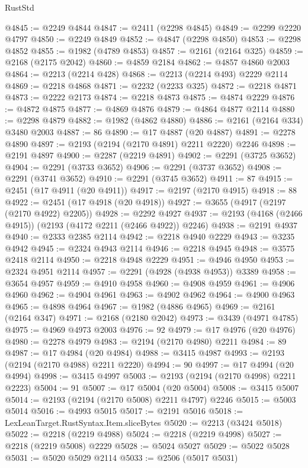 \begin{lexlean}{RustStd}
\begin{coremodule}
@4845 := @2249 @4844
@4847 := @2411 (@2298 @4845)
@4849 := @2299 @2220 @4797
@4850 := @2249 @4849
@4852 := @4847 (@2298 @4850)
@4853 := @2298 @4852
@4855 := @1982 (@4789 @4853)
@4857 := @2161 (@2164 @325)
@4859 := @2168 (@2175 @2042)
@4860 := @4859 @2184
@4862 := @4857 @4860 @2003
@4864 := @2213 (@2214 @428)
@4868 := @2213 (@2214 @493) @2229 @2114
@4869 := @2218 @4868
@4871 := @2232 (@2233 @325)
@4872 := @2218 @4871
@4873 := @2222 @2173
@4874 := @2218 @4873
@4875 := @4874 @2229
@4876 := @4872 @4875
@4877 := @4869 @4876
@4879 := @4864 @4877 @2114
@4880 := @2298 @4879
@4882 := @1982 (@4862 @4880)
@4886 := @2161 (@2164 @334) @3480 @2003
@4887 := 86
@4890 := @17 @4887 (@20 @4887)
@4891 := @2278 @4890
@4897 := @2193 (@2194 (@2170 @4891) @2211 @2220) @2246
@4898 := @2191 @4897
@4900 := @2287 (@2219 @4891)
@4902 := @2291 (@3725 @3652)
@4904 := @2291 (@3733 @3652)
@4906 := @2291 (@3737 @3652)
@4908 := @2291 (@3741 @3652)
@4910 := @2291 (@3745 @3652)
@4911 := 87
@4915 := @2451 (@17 @4911 (@20 @4911))
@4917 := @2197 (@2170 @4915)
@4918 := 88
@4922 := @2451 (@17 @4918 (@20 @4918))
@4927 := @3655 (@4917 (@2197 (@2170 @4922) @2205))
@4928 := @2292 @4927
@4937 := @2193 (@4168 (@2466 @4915)) (@2193 (@4172 @2211 (@2466 @4922)) @2246)
@4938 := @2191 @4937
@4940 := @2333 @2385 @2114
@4942 := @2218 @4940 @2229
@4943 := @3235 @4942
@4945 := @2324 @4943 @2114
@4946 := @2218 @4945
@4948 := @3575 @2418 @2114
@4950 := @2218 @4948 @2229
@4951 := @4946 @4950
@4953 := @2324 @4951 @2114
@4957 := @2291 (@4928 (@4938 @4953)) @3389
@4958 := @3654 @4957
@4959 := @4910 @4958
@4960 := @4908 @4959
@4961 := @4906 @4960
@4962 := @4904 @4961
@4963 := @4902 @4962
@4964 := @4900 @4963
@4965 := @4898 @4964
@4967 := @1982 (@4886 @4965)
@4969 := @2161 (@2164 @347)
@4971 := @2168 (@2180 @2042)
@4973 := @3439 (@4971 @4785)
@4975 := @4969 @4973 @2003
@4976 := 92
@4979 := @17 @4976 (@20 @4976)
@4980 := @2278 @4979
@4983 := @2194 (@2170 @4980) @2211
@4984 := 89
@4987 := @17 @4984 (@20 @4984)
@4988 := @3415 @4987
@4993 := @2193 (@2194 (@2170 @4988) @2211 @2220)
@4994 := 90
@4997 := @17 @4994 (@20 @4994)
@4998 := @3415 @4997
@5003 := @2193 (@2194 (@2170 @4998) @2211 @2223)
@5004 := 91
@5007 := @17 @5004 (@20 @5004)
@5008 := @3415 @5007
@5014 := @2193 (@2194 (@2170 @5008) @2211 @4797) @2246
@5015 := @5003 @5014
@5016 := @4993 @5015
@5017 := @2191 @5016
@5018 := LexLeanTarget.RustSyntax.Item.sliceBytes
@5020 := @2213 (@3424 @5018)
@5022 := @2218 (@2219 @4988)
@5024 := @2218 (@2219 @4998)
@5027 := @2218 (@2219 @5008) @2229
@5028 := @5024 @5027
@5029 := @5022 @5028
@5031 := @5020 @5029 @2114
@5033 := @2506 (@5017 @5031)

\end{coremodule}
\end{lexlean}
